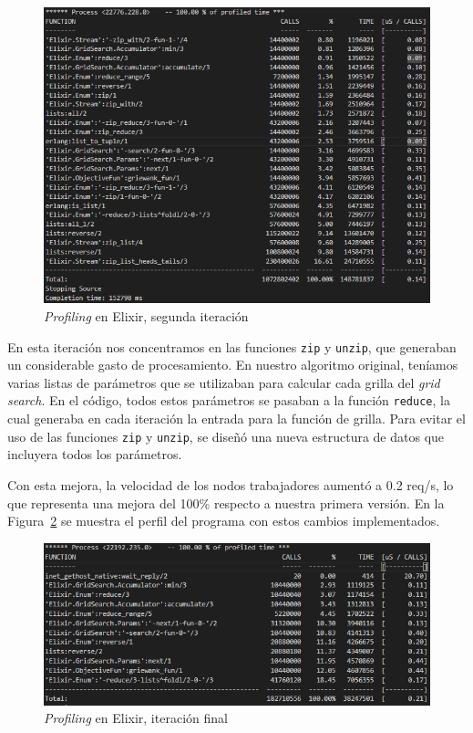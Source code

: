 \documentclass[11pt]{article}
\newcommand{\english}[1]{\textit{#1}}
\begin{document}
\begin{figure}[ht]
    \centering
    \includegraphics[scale=0.4]{resources/distributed_systems/elixir/2.png}
    \caption{\english{Profiling} en Elixir, segunda iteración}
    \label{fig:elx:profiling_2}
\end{figure}

En esta iteración nos concentramos en las funciones \lstinline{zip} y \lstinline{unzip}, que generaban un considerable gasto de procesamiento. En nuestro algoritmo original, teníamos varias listas de parámetros que se utilizaban para calcular cada grilla del \textit{grid search}. En el código, todos estos parámetros se pasaban a la función \lstinline{reduce}, la cual generaba en cada iteración la entrada para la función de grilla. Para evitar el uso de las funciones \lstinline{zip} y \lstinline{unzip}, se diseñó una nueva estructura de datos que incluyera todos los parámetros.

Con esta mejora, la velocidad de los nodos trabajadores aumentó a 0.2 req/s, lo que representa una mejora del 100\% respecto a nuestra primera versión. En la Figura~\ref{fig:elx:profiling_3} se muestra el perfil del programa con estos cambios implementados.

\begin{figure}[ht]
    \centering
    \includegraphics[scale=0.4]{resources/distributed_systems/elixir/3.png}
    \caption{\english{Profiling} en Elixir, iteración final}
    \label{fig:elx:profiling_3}
\end{figure}
\end{document}
